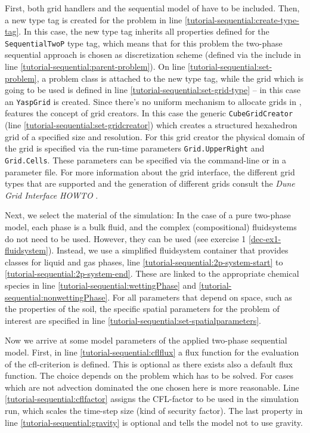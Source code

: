 First, both \Dune  grid handlers and the sequential model of \Dumux
have to be included. Then, a new type tag is created for the problem
in line \ref{tutorial-sequential:create-type-tag}.  In this case, the
new type tag inherits all properties defined for the \texttt{SequentialTwoP}
type tag, which means that for this problem the two-phase sequential approach
is chosen as discretization scheme (defined via the include in line
\ref{tutorial-sequential:parent-problem}). On line \ref{tutorial-sequential:set-problem},
a problem class is attached to the new type tag, while the grid which
is going to be used is defined in line \ref{tutorial-sequential:set-grid-type} --
in this case an \texttt{YaspGrid} is created. Since there's no uniform mechanism to
allocate grids in \Dune, \Dumux features the concept of grid creators.
In this case the generic \texttt{CubeGridCreator} (line \ref{tutorial-sequential:set-gridcreator}) which creates a
structured hexahedron grid of a specified size and resolution. For
this grid creator the  physical domain of the grid is specified via the
run-time parameters \texttt{Grid.UpperRight} and
\texttt{Grid.Cells}. These parameters can be specified via
the command-line or in a parameter file.
For more information about the \Dune grid interface, the different grid types
that are supported and the generation of different grids consult
the \textit{Dune Grid Interface HOWTO} \cite{DUNE-HP}.

Next, we select the material of the simulation: In the case of a pure two-phase
model, each phase is a bulk fluid, and the complex (compositional) fluidsystems
do not need to be used. However, they can be used (see exercise 1 \ref{dec-ex1-fluidsystem}).
Instead, we use a simplified fluidsystem container that provides classes
for liquid and gas phases, line \ref{tutorial-sequential:2p-system-start} to
\ref{tutorial-sequential:2p-system-end}. These are linked to the appropriate
chemical species in line \ref{tutorial-sequential:wettingPhase} and
\ref{tutorial-sequential:nonwettingPhase}. For all parameters that depend
on space, such as the properties of the soil, the specific spatial parameters
for the problem of interest are specified in line
\ref{tutorial-sequential:set-spatialparameters}.

Now we arrive at some model parameters of the applied two-phase sequential
model. First, in line  \ref{tutorial-sequential:cflflux} a flux function for the
evaluation of the cfl-criterion is defined. This is optional as there exists also
a default flux function. The choice depends on the problem which has to be solved.
For cases which are not advection dominated the one chosen here is more reasonable.
Line \ref{tutorial-sequential:cflfactor} assigns the CFL-factor to be used in the
simulation run, which scales the time-step size (kind of security factor). The last
property in line \ref{tutorial-sequential:gravity}
is optional and tells the model not to use gravity.

